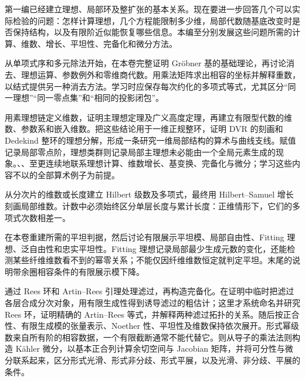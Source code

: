 

\BookPartGuide
第一编已经建立理想、局部环及整扩张的基本关系。现在要进一步回答几个可以实际检验的问题：怎样计算理想，几个方程能限制多少维，局部代数随基底改变时是否保持结构，以及有限阶近似能恢复哪些信息。本编至分别发展这些问题所需的计算、维数、增长、平坦性、完备化和微分方法。

\ProseParagraphBreak
{}从单项式序和多元除法开始，在本卷完整证明 Gröbner 基的基础理论，再讨论消去、理想运算、参数例外和零维商代数。用乘法矩阵求出相容的坐标并解释重数，以结式提供另一种消去方法。学习时应保存每次约化的多项式等式，尤其区分“同一理想”“同一零点集”和“相同的投影闭包”。

\ProseParagraphBreak
{}用素理想链定义维数，证明主理想定理及广义高度定理，再建立有限型代数的维数、参数系和嵌入维数。把这些结论用于一维正规整环，证明 DVR 的刻画和 Dedekind 整环的理想分解，形成一条研究一维局部结构的算术与曲线支线。赋值记录局部零点阶，理想类群则记录局部主理想未必能由一个全局元素生成的现象。、、至更连续地联系理想计算、维数增长、基变换、完备化与微分；学习这些内容不以的全部算术例子为前提。

\ProseParagraphBreak
{}从分次片的维数或长度建立 Hilbert 级数及多项式，最终用 Hilbert–Samuel 增长刻画局部维数。计数中必须始终区分单层长度与累计长度：正维情形下，它们的多项式次数相差一。

\ProseParagraphBreak
{}在本卷重建所需的平坦判据，然后讨论有限展示平坦模、局部自由性、Fitting 理想、泛自由性和忠实平坦性。Fitting 理想记录局部最少生成元数的变化，还能检测某些纤维维数看不到的幂零关系；不能仅因纤维维数恒定就判定平坦。末尾的说明带余圈相容条件的有限展示模下降。

\ProseParagraphBreak
{}通过 Rees 环和 Artin–Rees 引理处理滤过，再构造完备化。在证明中临时把滤过各层合成分次对象，用有限生成性得到诱导滤过的粗估计；这里才系统命名并研究 Rees 环，证明精确的 Artin–Rees 等式，并解释两种滤过拓扑的关系。随后按正合性、有限生成模的张量表示、Noether 性、平坦性及维数保持依次展开。形式幂级数来自所有阶的相容数据，一个有限截断通常不能代替它。则从导子的乘法法则构造 Kähler 微分，以基本正合列计算余切空间与 Jacobian 矩阵，并将可分性与微分联系起来，区分形式光滑、形式非分歧、形式平展，以及光滑、非分歧、平展的条件。

